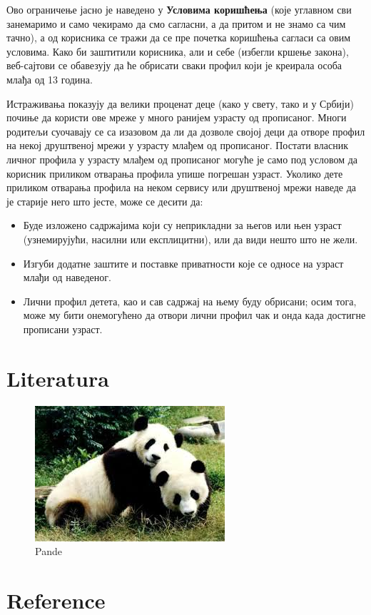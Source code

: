 \documentclass[a4paper]{article}
\begin{document}
Ово ограничење јасно је наведено у \textbf{Условима коришћења} \cite{TOS}(које углавном сви занемаримо и само чекирамо да смо сагласни, а да притом и не знамо са чим тачно), а од корисника се тражи да се пре почетка коришћења сагласи са овим условима. Како би заштитили корисника, али и себе (избегли кршење закона), веб-сајтови се обавезују да ће обрисати сваки профил који је креирала особа млађа од 13 година. 

Истраживања показују да велики проценат деце (како у свету, тако и у Србији) почиње да користи ове мреже у много ранијем узрасту од прописаног.
Многи родитељи суочавају се са изазовом да ли да дозволе својој деци да отворе профил на некој друштвеној мрежи у узрасту млађем од прописаног. Постати власник личног профила у узрасту млађем од прописаног могуће је само под условом да корисник приликом отварања профила упише погрешан узраст.
Уколико дете приликом отварања профила на неком сервису или друштвеној мрежи наведе да је старије него што јесте, може се десити да:

\begin{itemize}


\item	Буде изложено садржајима који су неприкладни за његов или њен узраст (узнемирујући, насилни или експлицитни), или да види нешто што не жели.

\item	Изгуби додатне заштите и поставке приватности које се односе на узраст млађи од наведеног.

\item	Лични профил детета, као и сав садржај на њему буду обрисани; осим тога, може му бити онемогућено да отвори лични профил чак и онда када достигне прописани узраст.

\end{itemize}

\section{Literatura}

\usepackage{graphicx}
\begin{figure}[h!]
\begin{center}
\includegraphics[scale=0.75]{pande.jpg}
\end{center}
\caption{Pande}
\label{fig:pande}
\end{figure}

\section{Reference}
\end{document}
